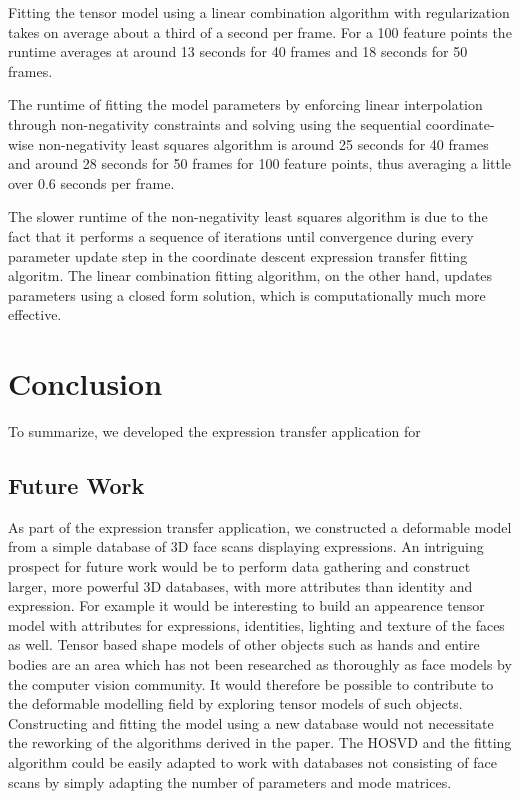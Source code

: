 \documentclass[11pt,a4paper,twoside]{report}
\begin{document}
Fitting the tensor model using a linear combination algorithm with
regularization takes on average about a third of a second per frame. For a 100
feature points the runtime averages at around 13 seconds for 40 frames and 18
seconds for 50 frames. 

The runtime of fitting the model parameters by enforcing linear interpolation through
non-negativity constraints and solving using the sequential coordinate-wise
non-negativity least squares algorithm is around 25 seconds for 40
frames and around 28 seconds for 50 frames for 100 feature points, thus averaging a little over 0.6
seconds per frame. 

The slower runtime of the non-negativity least squares algorithm is due to the
fact that it performs a sequence of iterations until convergence during every parameter update step in the
coordinate descent expression transfer fitting algoritm. The linear
combination fitting algorithm, on the other hand, updates parameters using a
closed form solution, which is computationally much more effective.

\chapter{Conclusion}
To summarize, we developed the expression transfer application for 
\section{Future Work}
As part of the expression transfer application, we constructed a deformable model from a simple database of 3D face scans displaying
expressions. An intriguing prospect for future work would be to perform data
gathering and construct larger, more powerful 3D databases,
with more attributes than identity and expression. For example it would be
interesting to build an appearence tensor model with attributes for expressions,
identities, lighting and texture of the faces as well. Tensor based shape models of other objects
such as hands and entire bodies are an area which has not been researched as
thoroughly as face models by the computer vision community. It would therefore
be possible to contribute to the deformable modelling field by exploring tensor models
of such objects. Constructing and fitting the model using a new database would not necessitate the reworking of the algorithms derived in the
paper. The HOSVD and the fitting algorithm could be easily adapted to work with
databases not consisting of face scans by simply adapting the number of
parameters and mode matrices. 
\end{document}
